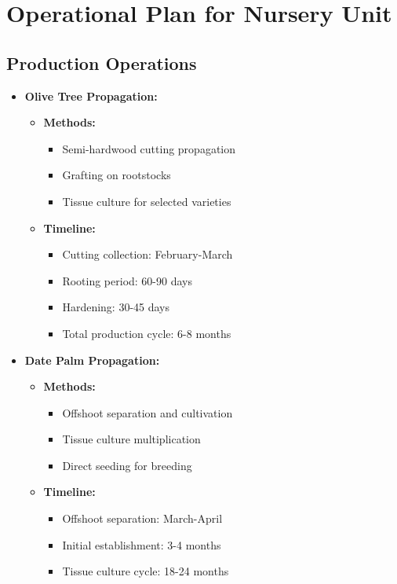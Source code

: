 \section{Operational Plan for Nursery Unit}

\subsection{Production Operations}
\begin{itemize}
    \item \textbf{Olive Tree Propagation:}
    \begin{itemize}
        \item \textbf{Methods:}
        \begin{itemize}
            \item Semi-hardwood cutting propagation
            \item Grafting on rootstocks
            \item Tissue culture for selected varieties
        \end{itemize}
        \item \textbf{Timeline:}
        \begin{itemize}
            \item Cutting collection: February-March
            \item Rooting period: 60-90 days
            \item Hardening: 30-45 days
            \item Total production cycle: 6-8 months
        \end{itemize}
    \end{itemize}
    
    \item \textbf{Date Palm Propagation:}
    \begin{itemize}
        \item \textbf{Methods:}
        \begin{itemize}
            \item Offshoot separation and cultivation
            \item Tissue culture multiplication
            \item Direct seeding for breeding
        \end{itemize}
        \item \textbf{Timeline:}
        \begin{itemize}
            \item Offshoot separation: March-April
            \item Initial establishment: 3-4 months
            \item Tissue culture cycle: 18-24 months
        \end{itemize}
    \end{itemize}
\end{itemize}

